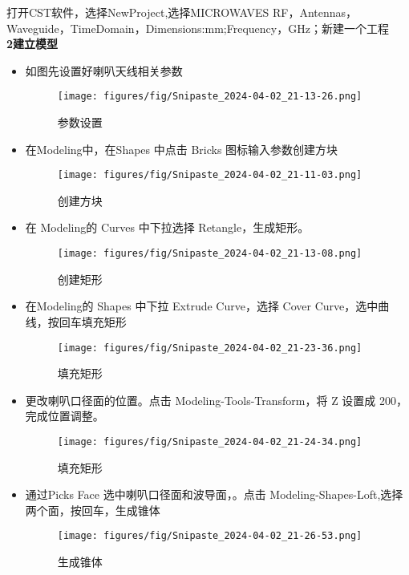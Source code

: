 \documentclass[12pt,hyperref,a4paper,UTF8]{ctexart}
\begin{document}
打开CST软件，选择NewProject,选择MICROWAVES RF，Antennas，Waveguide，TimeDomain，Dimensions:mm;Frequency，GHz；新建一个工程 \\
\textbf{2建立模型}
\begin{itemize}
    \item 如图先设置好喇叭天线相关参数
    \begin{figure}[H]
        \centering
        \texttt{[image: figures/fig/Snipaste\_2024-04-02\_21-13-26.png]}
        \caption{参数设置}
        \label{fig:enter-label}
    \end{figure}
    \item 在Modeling中，在Shapes 中点击 Bricks 图标输入参数创建方块
    \begin{figure}[H]
        \centering
        \texttt{[image: figures/fig/Snipaste\_2024-04-02\_21-11-03.png]}
        \caption{创建方块}
        \label{fig:enter-label}
    \end{figure}
    \item 在 Modeling的 Curves 中下拉选择 Retangle，生成矩形。
    \begin{figure}[H]
        \centering
        \texttt{[image: figures/fig/Snipaste\_2024-04-02\_21-13-08.png]}
        \caption{创建矩形}
        \label{fig:enter-label}
    \end{figure}
    \item 在Modeling的 Shapes 中下拉 Extrude Curve，选择 Cover Curve，选中曲线，按回车填充矩形
    \begin{figure}[H]
        \centering
        \texttt{[image: figures/fig/Snipaste\_2024-04-02\_21-23-36.png]}
        \caption{填充矩形}
        \label{fig:enter-label}
    \end{figure}
    \item 更改喇叭口径面的位置。点击 Modeling-Tools-Transform，将 Z 设置成 200，完成位置调整。
    \begin{figure}[H]
        \centering
        \texttt{[image: figures/fig/Snipaste\_2024-04-02\_21-24-34.png]}
        \caption{填充矩形}
        \label{fig:enter-label}
    \end{figure}
    \item 通过Picks Face 选中喇叭口径面和波导面，。点击 Modeling-Shapes-Loft,选择两个面，按回车，生成锥体
    \begin{figure}[H]
        \centering
        \texttt{[image: figures/fig/Snipaste\_2024-04-02\_21-26-53.png]}
        \caption{生成锥体}
        \label{fig:enter-label}

\end{figure}
\end{itemize}
\end{document}
